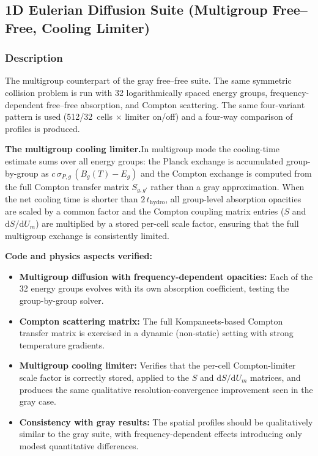 \documentclass[11pt,a4paper]{article}
\begin{document}
\newpage

\subsection{1D Eulerian Diffusion Suite (Multigroup Free--Free, Cooling Limiter)}
\label{sec:eulerian_diffusion_freefree_multigroup_suite}

\subsubsection*{Description}
The multigroup counterpart of the gray free--free suite. The same symmetric collision problem is run with 32 logarithmically spaced energy groups, frequency-dependent free--free absorption, and Compton scattering. The same four-variant pattern is used (512/32~cells $\times$ limiter on/off) and a four-way comparison of profiles is produced.

\textbf{The multigroup cooling limiter.}\enspace In multigroup mode the cooling-time estimate sums over all energy groups: the Planck exchange is accumulated group-by-group as $c\,\sigma_{P,g}\,(B_g(T) - E_g)$ and the Compton exchange is computed from the full Compton transfer matrix $S_{g,g'}$ rather than a gray approximation. When the net cooling time is shorter than $2\,t_{\mathrm{hydro}}$, all group-level absorption opacities are scaled by a common factor and the Compton coupling matrix entries ($S$ and $\mathrm{d}S/\mathrm{d}U_m$) are multiplied by a stored per-cell scale factor, ensuring that the full multigroup exchange is consistently limited.

\textbf{Code and physics aspects verified:}
\begin{itemize}
  \item \textbf{Multigroup diffusion with frequency-dependent opacities:} Each of the 32 energy groups evolves with its own absorption coefficient, testing the group-by-group solver.
  \item \textbf{Compton scattering matrix:} The full Kompaneets-based Compton transfer matrix is exercised in a dynamic (non-static) setting with strong temperature gradients.
  \item \textbf{Multigroup cooling limiter:} Verifies that the per-cell Compton-limiter scale factor is correctly stored, applied to the $S$ and $\mathrm{d}S/\mathrm{d}U_m$ matrices, and produces the same qualitative resolution-convergence improvement seen in the gray case.
  \item \textbf{Consistency with gray results:} The spatial profiles should be qualitatively similar to the gray suite, with frequency-dependent effects introducing only modest quantitative differences.
\end{itemize}
\end{document}
